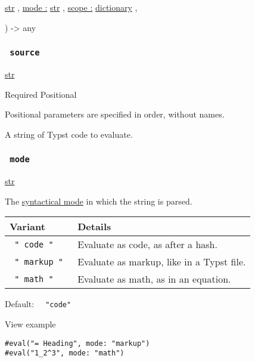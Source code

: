 { \href{/docs/reference/foundations/str/}{str} , } {
\hyperref[parameters-mode]{mode :}
\href{/docs/reference/foundations/str/}{str} , } {
\hyperref[parameters-scope]{scope :}
\href{/docs/reference/foundations/dictionary/}{dictionary} , }

) -\textgreater{} { any }

\subsubsection{\texorpdfstring{\texttt{\ source\ }}{ source }}\label{parameters-source}

\href{/docs/reference/foundations/str/}{str}

{Required} {{ Positional }}

\label{parameters-source-positional-tooltip}
Positional parameters are specified in order, without names.

A string of Typst code to evaluate.

\subsubsection{\texorpdfstring{\texttt{\ mode\ }}{ mode }}\label{parameters-mode}

\href{/docs/reference/foundations/str/}{str}

The \href{/docs/reference/syntax/\#modes}{syntactical mode} in which the
string is parsed.

\begin{longtable}[]{@{}ll@{}}
\toprule\noalign{}
Variant & Details \\
\midrule\noalign{}
\endhead
\bottomrule\noalign{}
\endlastfoot
\texttt{\ "\ code\ "\ } & Evaluate as code, as after a hash. \\
\texttt{\ "\ markup\ "\ } & Evaluate as markup, like in a Typst file. \\
\texttt{\ "\ math\ "\ } & Evaluate as math, as in an equation. \\
\end{longtable}

Default: \texttt{\ }{\texttt{\ "code"\ }}\texttt{\ }


View example

\begin{verbatim}
#eval("= Heading", mode: "markup")
#eval("1_2^3", mode: "math")
\end{verbatim}

